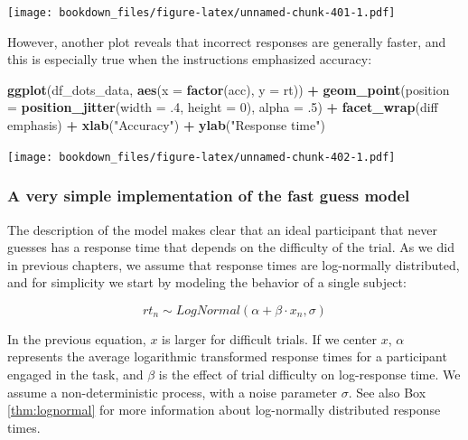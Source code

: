 \documentclass[12pt,]{krantz}
\newenvironment{Shaded}{\begin{snugshade}}{\end{snugshade}}
\newcommand{\DataTypeTok}[1]{\textcolor[rgb]{0.13,0.29,0.53}{#1}}
\newcommand{\DecValTok}[1]{\textcolor[rgb]{0.00,0.00,0.81}{#1}}
\newcommand{\FloatTok}[1]{\textcolor[rgb]{0.00,0.00,0.81}{#1}}
\newcommand{\KeywordTok}[1]{\textcolor[rgb]{0.13,0.29,0.53}{\textbf{#1}}}
\newcommand{\NormalTok}[1]{#1}
\newcommand{\OperatorTok}[1]{\textcolor[rgb]{0.81,0.36,0.00}{\textbf{#1}}}
\newcommand{\StringTok}[1]{\textcolor[rgb]{0.31,0.60,0.02}{#1}}
\theoremstyle{definition}
\theoremstyle{definition}
\theoremstyle{definition}
\theoremstyle{remark}
\begin{document}
\texttt{[image: bookdown\_files/figure-latex/unnamed-chunk-401-1.pdf]}

However, another plot reveals that incorrect responses are generally faster, and this is especially true when the instructions emphasized accuracy:

\begin{Shaded}
\begin{Highlighting}[]
\KeywordTok{ggplot}\NormalTok{(df_dots_data, }\KeywordTok{aes}\NormalTok{(}\DataTypeTok{x =} \KeywordTok{factor}\NormalTok{(acc), }\DataTypeTok{y =}\NormalTok{ rt)) }\OperatorTok{+}
\StringTok{  }\KeywordTok{geom_point}\NormalTok{(}\DataTypeTok{position =} \KeywordTok{position_jitter}\NormalTok{(}\DataTypeTok{width =} \FloatTok{.4}\NormalTok{, }\DataTypeTok{height =} \DecValTok{0}\NormalTok{),}
             \DataTypeTok{alpha =} \FloatTok{.5}\NormalTok{) }\OperatorTok{+}
\StringTok{  }\KeywordTok{facet_wrap}\NormalTok{(diff }\OperatorTok{~}\StringTok{ }\NormalTok{emphasis) }\OperatorTok{+}
\StringTok{  }\KeywordTok{xlab}\NormalTok{(}\StringTok{"Accuracy"}\NormalTok{) }\OperatorTok{+}
\StringTok{  }\KeywordTok{ylab}\NormalTok{(}\StringTok{"Response time"}\NormalTok{)}
\end{Highlighting}
\end{Shaded}

\texttt{[image: bookdown\_files/figure-latex/unnamed-chunk-402-1.pdf]}

\hypertarget{a-very-simple-implementation-of-the-fast-guess-model}{%
\subsubsection{A very simple implementation of the fast guess model}\label{a-very-simple-implementation-of-the-fast-guess-model}}

The description of the model makes clear that an ideal participant that never guesses has a response time that depends on the difficulty of the trial. As we did in previous chapters, we assume that response times are log-normally distributed, and for simplicity we start by modeling the behavior of a single subject:

\begin{equation}
rt_n \sim LogNormal(\alpha + \beta \cdot x_n, \sigma)
\end{equation}

In the previous equation, \(x\) is larger for difficult trials. If we center \(x\), \(\alpha\) represents the average logarithmic transformed response times for a participant engaged in the task, and \(\beta\) is the effect of trial difficulty on log-response time. We assume a non-deterministic process, with a noise parameter \(\sigma\). See also Box \ref{thm:lognormal} for more information about log-normally distributed response times.
\end{document}
